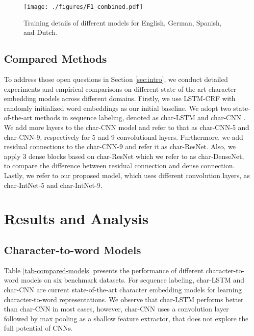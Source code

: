 \documentclass[11pt,a4paper]{article}
\begin{document}
\begin{figure*}[htb]
  \centering
  \texttt{[image: ./figures/F1\_combined.pdf]}
  \caption{Training details of different models for English, German, Spanish, and Dutch.}
  \label{fig-f1-training}
\end{figure*}


\subsection{Compared Methods} 

To address those open questions in Section \ref{sec:intro}, we conduct detailed experiments and empirical comparisons on different state-of-the-art character embedding models across different domains. Firstly, we use LSTM-CRF with randomly initialized word embeddings as our initial baseline. We adopt two state-of-the-art methods in sequence labeling, denoted as char-LSTM \cite{lample2016neural} and char-CNN \cite{ma2016end}. We add more layers to the char-CNN model and refer to that as char-CNN-5 and char-CNN-9, respectively for 5 and 9 convolutional layers. Furthermore, we add residual connections to the char-CNN-9 and refer it as char-ResNet. Also, we apply 3 dense blocks based on char-ResNet which we refer to as char-DenseNet, to compare the difference between residual connection and dense connection. Lastly, we refer to our proposed model, which uses different convolution layers, as char-IntNet-5 and char-IntNet-9.
 
\section{Results and Analysis}
\label{sec:results}

\subsection{Character-to-word Models}

Table \ref{tab-compared-models} presents the performance of different character-to-word models on six benchmark datasets. For sequence labeling, char-LSTM and char-CNN are current state-of-the-art character embedding models for learning character-to-word representations. We observe that char-LSTM performs better than char-CNN in most cases, however, char-CNN uses a convolution layer followed by max pooling as a shallow feature extractor, that does not explore the full potential of CNNs. 
\end{document}
